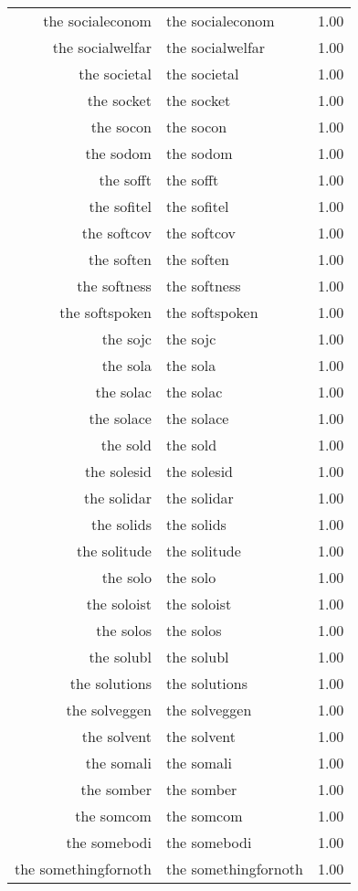 \begin{table}[ht]
\begin{tabular}{rlr}
  the socialeconom & the socialeconom & 1.00 \\ 
  the socialwelfar & the socialwelfar & 1.00 \\ 
  the societal & the societal & 1.00 \\ 
  the socket & the socket & 1.00 \\ 
  the socon & the socon & 1.00 \\ 
  the sodom & the sodom & 1.00 \\ 
  the sofft & the sofft & 1.00 \\ 
  the sofitel & the sofitel & 1.00 \\ 
  the softcov & the softcov & 1.00 \\ 
  the soften & the soften & 1.00 \\ 
  the softness & the softness & 1.00 \\ 
  the softspoken & the softspoken & 1.00 \\ 
  the sojc & the sojc & 1.00 \\ 
  the sola & the sola & 1.00 \\ 
  the solac & the solac & 1.00 \\ 
  the solace & the solace & 1.00 \\ 
  the sold & the sold & 1.00 \\ 
  the solesid & the solesid & 1.00 \\ 
  the solidar & the solidar & 1.00 \\ 
  the solids & the solids & 1.00 \\ 
  the solitude & the solitude & 1.00 \\ 
  the solo & the solo & 1.00 \\ 
  the soloist & the soloist & 1.00 \\ 
  the solos & the solos & 1.00 \\ 
  the solubl & the solubl & 1.00 \\ 
  the solutions & the solutions & 1.00 \\ 
  the solveggen & the solveggen & 1.00 \\ 
  the solvent & the solvent & 1.00 \\ 
  the somali & the somali & 1.00 \\ 
  the somber & the somber & 1.00 \\ 
  the somcom & the somcom & 1.00 \\ 
  the somebodi & the somebodi & 1.00 \\ 
  the somethingfornoth & the somethingfornoth & 1.00 \\ 

\end{tabular}
\end{table}
